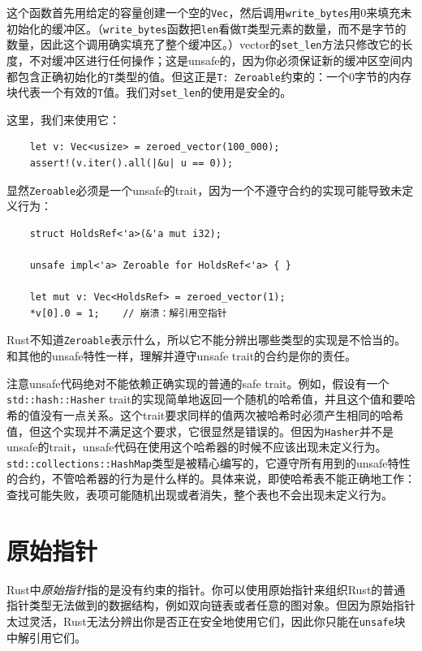 这个函数首先用给定的容量创建一个空的\texttt{Vec}，然后调用\texttt{write\_bytes}用0来填充未初始化的缓冲区。（\texttt{write\_bytes}函数把\texttt{len}看做\texttt{T}类型元素的数量，而不是字节的数量，因此这个调用确实填充了整个缓冲区。）vector的\texttt{set\_len}方法只修改它的长度，不对缓冲区进行任何操作；这是unsafe的，因为你必须保证新的缓冲区空间内都包含正确初始化的\texttt{T}类型的值。但这正是\texttt{T: Zeroable}约束的：一个0字节的内存块代表一个有效的\texttt{T}值。我们对\texttt{set\_len}的使用是安全的。

这里，我们来使用它：
\begin{verbatim}
    let v: Vec<usize> = zeroed_vector(100_000);
    assert!(v.iter().all(|&u| u == 0));
\end{verbatim}

显然\texttt{Zeroable}必须是一个unsafe的trait，因为一个不遵守合约的实现可能导致未定义行为：
\begin{verbatim}
    struct HoldsRef<'a>(&'a mut i32);

    unsafe impl<'a> Zeroable for HoldsRef<'a> { }

    let mut v: Vec<HoldsRef> = zeroed_vector(1);
    *v[0].0 = 1;    // 崩溃：解引用空指针
\end{verbatim}

Rust不知道\texttt{Zeroable}表示什么，所以它不能分辨出哪些类型的实现是不恰当的。和其他的unsafe特性一样，理解并遵守unsafe trait的合约是你的责任。

注意unsafe代码绝对不能依赖正确实现的普通的safe trait。例如，假设有一个\\
\texttt{std::hash::Hasher} trait的实现简单地返回一个随机的哈希值，并且这个值和要哈希的值没有一点关系。这个trait要求同样的值两次被哈希时必须产生相同的哈希值，但这个实现并不满足这个要求，它很显然是错误的。但因为\texttt{Hasher}并不是unsafe的trait，unsafe代码在使用这个哈希器的时候不应该出现未定义行为。\texttt{std::collections::HashMap}类型是被精心编写的，它遵守所有用到的unsafe特性的合约，不管哈希器的行为是什么样的。具体来说，即使哈希表不能正确地工作：查找可能失败，表项可能随机出现或者消失，整个表也不会出现未定义行为。

\section{原始指针}\label{rawp}
Rust中\emph{原始指针}指的是没有约束的指针。你可以使用原始指针来组织Rust的普通指针类型无法做到的数据结构，例如双向链表或者任意的图对象。但因为原始指针太过灵活，Rust无法分辨出你是否正在安全地使用它们，因此你只能在\texttt{unsafe}块中解引用它们。


